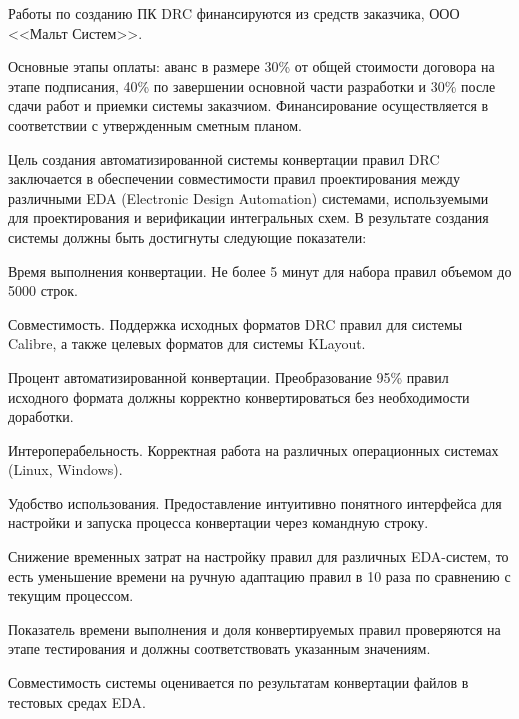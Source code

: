 Работы по созданию ПК DRC финансируются из средств заказчика,
ООО <<Мальт Систем>>.

Основные этапы оплаты:
аванс в размере 30\% от общей стоимости договора на этапе подписания,
40\% по завершении основной части разработки
и 30\% после сдачи работ и приемки системы заказчиом.
Финансирование осуществляется в соответствии с утвержденным сметным планом.



Цель создания автоматизированной системы конвертации правил DRC заключается
в обеспечении совместимости правил проектирования
между различными EDA (Electronic Design Automation) системами,
используемыми для проектирования и верификации интегральных схем.
В результате создания системы должны быть достигнуты следующие показатели:


Время выполнения конвертации.
Не более 5 минут для набора правил объемом до 5000 строк.

Совместимость.
Поддержка исходных форматов DRC правил для системы Calibre,
а также целевых форматов для системы KLayout.

Процент автоматизированной конвертации.
Преобразование 95\% правил исходного формата должны корректно
конвертироваться без необходимости доработки.


Интероперабельность.
Корректная работа на различных операционных системах (Linux, Windows).

Удобство использования.
Предоставление интуитивно понятного интерфейса для настройки
и запуска процесса конвертации через командную строку.


Снижение временных затрат на настройку правил для различных EDA-систем,
то есть уменьшение времени на ручную адаптацию правил в 10 раза
по сравнению с текущим процессом.


Показатель времени выполнения
и доля конвертируемых правил проверяются на этапе тестирования
и должны соответствовать указанным значениям.

Совместимость системы оценивается
по результатам конвертации файлов в тестовых средах EDA.

